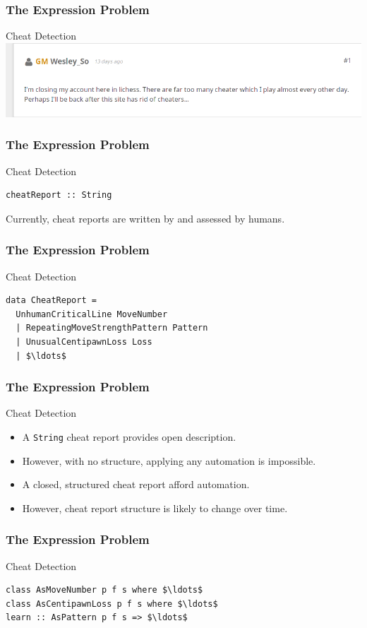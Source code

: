 \begin{frame}[fragile]
\frametitle{The Expression Problem}
\begin{block}{Cheat Detection}
\includegraphics[height=0.2\textheight,natwidth=883,natheight=184]{image/lichess-wesley-so-announce.png}
\par
\end{block}
\end{frame}

\begin{frame}[fragile]
\frametitle{The Expression Problem}
\begin{block}{Cheat Detection}
\begin{lstlisting}[style=haskell,mathescape]
cheatReport :: String
\end{lstlisting}
Currently, cheat reports are written by and assessed by humans.
\end{block}
\end{frame}

\begin{frame}[fragile]
\frametitle{The Expression Problem}
\begin{block}{Cheat Detection}
\begin{lstlisting}[style=haskell,mathescape]
data CheatReport =
  UnhumanCriticalLine MoveNumber
  | RepeatingMoveStrengthPattern Pattern
  | UnusualCentipawnLoss Loss
  | $\ldots$
\end{lstlisting}
\end{block}
\end{frame}

\begin{frame}[fragile]
\frametitle{The Expression Problem}
\begin{block}{Cheat Detection}
\begin{itemize}
\item A \lstinline{String} cheat report provides open description.
\item However, with no structure, applying any automation is impossible.
\item A closed, structured cheat report afford automation.
\item However, cheat report structure is likely to change over time.
\end{itemize}
\end{block}
\end{frame}

\begin{frame}[fragile]
\frametitle{The Expression Problem}
\begin{block}{Cheat Detection}
\begin{lstlisting}[style=haskell,mathescape]
class AsMoveNumber p f s where $\ldots$
class AsCentipawnLoss p f s where $\ldots$
learn :: AsPattern p f s => $\ldots$
\end{lstlisting}
\end{block}
\end{frame}
